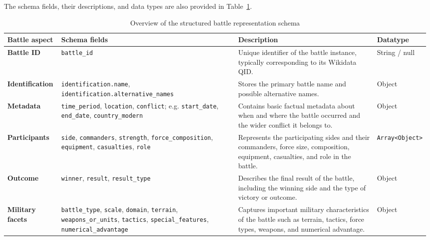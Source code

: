 The schema fields, their descriptions, and data types are also provided in Table~\ref{tab:battle_schema}.
\begin{table}[!htbp]
\centering
\caption{Overview of the structured battle representation schema}
\label{tab:battle_schema}

\footnotesize
\renewcommand{\arraystretch}{1.4}
\setlength{\tabcolsep}{4pt}

\begin{tabularx}{\textwidth}{
    >{\RaggedRight\arraybackslash}p{}
    >{\RaggedRight\arraybackslash}X
    >{\RaggedRight\arraybackslash}p{}
    >{\RaggedRight\arraybackslash}p{}
}
\toprule
\textbf{Battle aspect} &
\textbf{Schema fields} &
\textbf{Description} &
\textbf{Datatype} \\
\midrule

\textbf{Battle ID} &
\texttt{battle\_id} &
Unique identifier of the battle instance, typically corresponding
to its Wikidata QID. &
String / null \\
\midrule

\textbf{Identification} &
\texttt{identification.name},
\texttt{identification.alternative\_names} &
Stores the primary battle name and possible alternative names. &
Object \\
\midrule

\textbf{Metadata} &
\texttt{time\_period},
\texttt{location},
\texttt{conflict};
e.g. \texttt{start\_date},
\texttt{end\_date},
\texttt{country\_modern} &
Contains basic factual metadata about when and where the battle
occurred and the wider conflict it belongs to. &
Object \\
\midrule

\textbf{Participants} &
\texttt{side},
\texttt{commanders},
\texttt{strength},
\texttt{force\_composition},
\texttt{equipment},
\texttt{casualties},
\texttt{role} &
Represents the participating sides and their commanders,
force size, composition, equipment, casualties, and role
in the battle. &
\texttt{Array\textless Object\textgreater} \\
\midrule

\textbf{Outcome} &
\texttt{winner},
\texttt{result},
\texttt{result\_type} &
Describes the final result of the battle, including the
winning side and the type of victory or outcome. &
Object \\
\midrule

\textbf{Military facets} &
\texttt{battle\_type},
\texttt{scale},
\texttt{domain},
\texttt{terrain},
\texttt{weapons\_or\_units},
\texttt{tactics},
\texttt{special\_features},
\texttt{numerical\_advantage} &
Captures important military characteristics of the battle
such as terrain, tactics, force types, weapons, and
numerical advantage. &
Object \\
\midrule


\end{tabularx}
\end{table}
